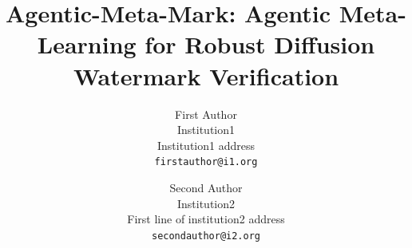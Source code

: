 \documentclass[10pt,twocolumn,letterpaper]{article}
\title{Agentic-Meta-Mark: Agentic Meta-Learning for Robust Diffusion Watermark Verification}
\author{First Author\\
Institution1\\
Institution1 address\\  
{\tt\small firstauthor@i1.org}
\and
Second Author\\
Institution2\\
First line of institution2 address\\
{\tt\small secondauthor@i2.org}
}
\begin{document}
\maketitle
    







{
    \small
    
    
}

% 










\end{document}
